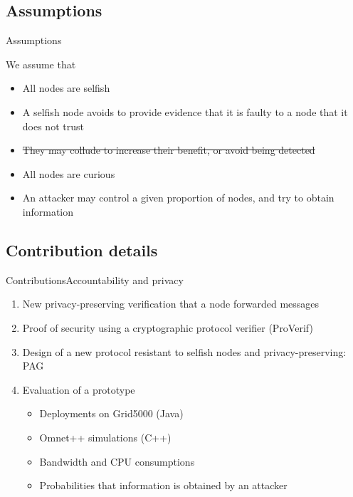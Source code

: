 \documentclass[10pt]{beamer}
\begin{document}
\subsection{Assumptions}
\begin{frame}{Assumptions}{} 
   \begin{block}{}
   We assume that
   \begin{itemize}
   \item All nodes are selfish
   \item A selfish node avoids to provide evidence that it is faulty to a node that it does not trust
   \item \sout{They may collude to increase their benefit, or avoid being detected}
   \item All nodes are curious
   \item An attacker may control a given proportion of nodes, and try to obtain information
   \end{itemize}
   \end{block}
\end{frame}

\subsection{Contribution details}
\begin{frame}{Contributions}{Accountability and privacy}
      \begin{enumerate}
        \item New privacy-preserving verification that a node forwarded messages
        \item Proof of security using a cryptographic protocol verifier (ProVerif)
        \item Design of a new protocol resistant to selfish nodes and privacy-preserving: PAG
        \item Evaluation of a prototype
        \begin{itemize}
          \item Deployments on Grid5000 (Java)
          \item Omnet++ simulations (C++)
          \item Bandwidth and CPU consumptions
          \item Probabilities that information is obtained by an attacker
          \end{itemize}
      \end{enumerate}
\end{frame}
\end{document}
